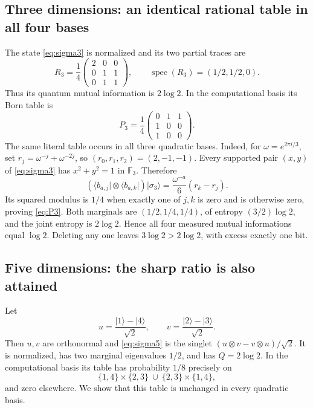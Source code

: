 \documentclass[11pt]{article}
\theoremstyle{remark}
\newcommand{\F}{\mathbb F}
\newcommand{\ket}[1]{\lvert #1\rangle}
\newcommand{\bra}[1]{\langle #1\rvert}
\begin{document}
\subsection{Three dimensions: an identical rational table in all four bases}
The state \eqref{eq:sigma3} is normalized and its two partial traces are
\begin{equation}\label{eq:R3}
 R_3=\frac14\begin{pmatrix}2&0&0\\0&1&1\\0&1&1\end{pmatrix},
 \qquad \operatorname{spec}(R_3)=(1/2,1/2,0).
\end{equation}
Thus its quantum mutual information is $2\log2$.
In the computational basis its Born table is
\begin{equation}\label{eq:P3}
 P_3=\frac14\begin{pmatrix}0&1&1\\1&0&0\\1&0&0\end{pmatrix}.
\end{equation}
The same literal table occurs in all three quadratic bases. Indeed, for $\omega=e^{2\pi i/3}$, set
$r_j=\omega^{-j}+\omega^{-2j}$, so $(r_0,r_1,r_2)=(2,-1,-1)$. Every supported pair $(x,y)$ of \eqref{eq:sigma3} has $x^2+y^2=1$ in $\F_3$. Therefore
\[
 (\bra{b_{a,j}}\otimes\bra{b_{a,k}})\ket{\sigma_3}
   =\frac{\omega^{-a}}6(r_k-r_j).
\]
Its squared modulus is $1/4$ when exactly one of $j,k$ is zero and is otherwise zero, proving \eqref{eq:P3}. Both marginals are $(1/2,1/4,1/4)$, of entropy $(3/2)\log2$, and the joint entropy is $2\log2$. Hence all four measured mutual informations equal $\log2$. Deleting any one leaves $3\log2>2\log2$, with excess exactly one bit.

\subsection{Five dimensions: the sharp ratio is also attained}
Let
\[
 u=\frac{\ket1-\ket4}{\sqrt2},\qquad
 v=\frac{\ket2-\ket3}{\sqrt2}.
\]
Then $u,v$ are orthonormal and \eqref{eq:sigma5} is the singlet
$(u\otimes v-v\otimes u)/\sqrt2$. It is normalized, has two marginal eigenvalues $1/2$, and has $Q=2\log2$.
In the computational basis its table has probability $1/8$ precisely on
\[
 \{1,4\}\times\{2,3\}\ \cup\ \{2,3\}\times\{1,4\},
\]
and zero elsewhere. We show that this table is unchanged in every quadratic basis.
\end{document}
